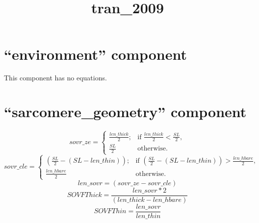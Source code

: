 \documentclass[10pt,landscape]{article}
\title{tran\_2009}
\author{}
\date{}
\begin{document}
  
\maketitle
\newcommand{\ud}{\mathrm{d}}
\section{``environment'' component}
This component has no equations.
\section{``sarcomere\_geometry'' component}
\textbf{}
\begin{displaymath}sovr\_ze = 
\begin{cases}\frac{len\_thick}{2};
        &  \text{if }\frac{len\_thick}{2} < \frac{SL}{2},\\\frac{SL}{2}&  \text{otherwise}.
\end{cases}
\end{displaymath}
\textbf{}
\begin{displaymath}sovr\_cle = 
\begin{cases}\left(\frac{SL}{2}-\left(SL-len\_thin\right)\right);
        &  \text{if }\left(\frac{SL}{2}-\left(SL-len\_thin\right)\right) > \frac{len\_hbare}{2},\\\frac{len\_hbare}{2}&  \text{otherwise}.
\end{cases}
\end{displaymath}
\textbf{}
\begin{displaymath}len\_sovr = \left(sovr\_ze-sovr\_cle\right)
\end{displaymath}
\textbf{}
\begin{displaymath}SOVFThick = \frac{len\_sovr \ast 2}{\left(len\_thick-len\_hbare\right)}
\end{displaymath}
\textbf{}
\begin{displaymath}SOVFThin = \frac{len\_sovr}{len\_thin}
\end{displaymath}
\end{document}
